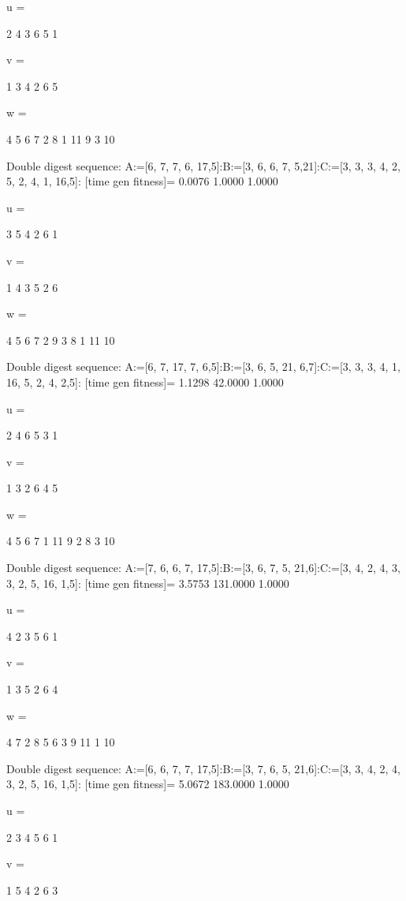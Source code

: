 u =

     2     4     3     6     5     1


v =

     1     3     4     2     6     5


w =

     4     5     6     7     2     8     1    11     9     3    10

Double digest sequence:
A:=[6, 7, 7, 6, 17,5]:B:=[3, 6, 6, 7, 5,21]:C:=[3, 3, 3, 4, 2, 5, 2, 4, 1, 16,5]:
[time gen fitness]=
    0.0076    1.0000    1.0000


u =

     3     5     4     2     6     1


v =

     1     4     3     5     2     6


w =

     4     5     6     7     2     9     3     8     1    11    10

Double digest sequence:
A:=[6, 7, 17, 7, 6,5]:B:=[3, 6, 5, 21, 6,7]:C:=[3, 3, 3, 4, 1, 16, 5, 2, 4, 2,5]:
[time gen fitness]=
    1.1298   42.0000    1.0000


u =

     2     4     6     5     3     1


v =

     1     3     2     6     4     5


w =

     4     5     6     7     1    11     9     2     8     3    10

Double digest sequence:
A:=[7, 6, 6, 7, 17,5]:B:=[3, 6, 7, 5, 21,6]:C:=[3, 4, 2, 4, 3, 3, 2, 5, 16, 1,5]:
[time gen fitness]=
    3.5753  131.0000    1.0000


u =

     4     2     3     5     6     1


v =

     1     3     5     2     6     4


w =

     4     7     2     8     5     6     3     9    11     1    10

Double digest sequence:
A:=[6, 6, 7, 7, 17,5]:B:=[3, 7, 6, 5, 21,6]:C:=[3, 3, 4, 2, 4, 3, 2, 5, 16, 1,5]:
[time gen fitness]=
    5.0672  183.0000    1.0000


u =

     2     3     4     5     6     1


v =

     1     5     4     2     6     3


